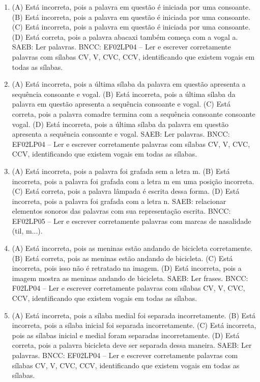 \begin{enumerate}
\item
(A) Está incorreta, pois a palavra em questão é iniciada por uma consoante.
(B) Está incorreta, pois a palavra em questão é iniciada por uma consoante.
(C) Está incorreta, pois a palavra em questão é iniciada por uma consoante.
(D) Está correta, pois a palavra abacaxi também começa com a vogal a.
SAEB: Ler palavras.
BNCC: EF02LP04 -- Ler e escrever corretamente palavras com
sílabas CV, V, CVC, CCV, identificando que existem vogais em todas as
sílabas.

\item
(A) Está incorreta, pois a última sílaba da palavra em questão apresenta a sequência consoante e vogal.
(B) Está incorreta, pois a última sílaba da palavra em questão apresenta a sequência consoante e vogal.
(C) Está correta, pois a palavra comadre termina com a sequência consoante consoante vogal.
(D) Está incorreta, pois a última sílaba da palavra em questão apresenta a sequência consoante e vogal.
SAEB: Ler palavras.
BNCC: EF02LP04 -- Ler e escrever corretamente palavras com
sílabas CV, V, CVC, CCV, identificando que existem vogais em todas as
sílabas.

\item
(A) Está incorreta, pois a palavra foi grafada sem a letra m.
(B) Está incorreta, pois a palavra foi grafada com a letra m em uma posição incorreta.
(C) Está correta, pois a palavra lâmpada é escrita dessa forma.
(D) Está incorreta, pois a palavra foi grafada com a letra n.
SAEB: relacionar elementos sonoros das palavras com sua representação
escrita.
BNCC: EF02LP05 -- Ler e escrever corretamente palavras com marcas de nasalidade
(til, m...).

\item
(A) Está incorreta, pois as meninas estão andando de bicicleta corretamente.
(B) Está correta, pois as meninas estão andando de bicicleta.
(C) Está incorreta, pois isso não é retratado na imagem.
(D) Está incorreta, pois a imagem mostra as meninas andando de bicicleta.
SAEB: Ler frases.
BNCC: F02LP04 -- Ler e escrever corretamente palavras com sílabas
CV, V, CVC, CCV, identificando que existem vogais em todas as sílabas.

\item
(A) Está incorreta, pois a sílaba medial foi separada incorretamente.
(B) Está incorreta, pois a sílaba inicial foi separada incorretamente.
(C) Está incorreta, pois as sílabas inicial e medial foram separadas incorretamente.
(D) Está correta, pois a palavra bicicleta deve ser separada dessa maneira.
SAEB: Ler palavras.
BNCC: EF02LP04 -- Ler e escrever corretamente palavras com
sílabas CV, V, CVC, CCV, identificando que existem vogais em todas as
sílabas.


\end{enumerate}

